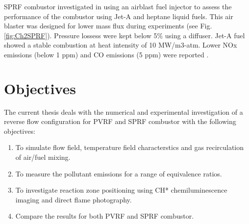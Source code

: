 SPRF combustor investigated in \cite{CJNYJS91338} using an airblast fuel injector to assess the performance of the combustor using Jet-A and heptane liquid fuels. This air blaster was designed for lower mass flux during experiments (see Fig. \ref{fig:Ch2SPRF}). Pressure lossess were kept below 5$\%$ using a diffuser. Jet-A fuel showed a stable combustion at heat intensity of 10 MW/m3-atm. Lower NOx emissions (below 1 ppm) and CO emissions (5 ppm) were reported \cite{10.1115/1.4043437}.

\section{Objectives}
The current thesis deals with the numerical and experimental investigation of a reverse flow configuration for PVRF and SPRF combustor with the following objectives:
\begin{enumerate}
    \item To simulate flow field, temperature field characterstics and gas recirculation of air/fuel mixing. 
    \item To measure the pollutant emissions for a range of equivalence ratios.
    \item To investigate reaction zone positioning using CH* chemiluminescence imaging and direct flame photography.
    \item Compare the results for both PVRF and SPRF combustor.
\end{enumerate}
